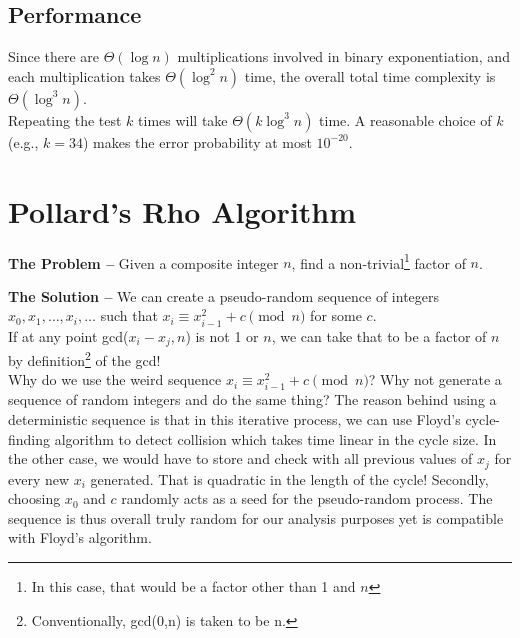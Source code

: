 \subsection{Performance}
Since there are \(\Theta(\log n)\) multiplications involved in binary exponentiation, 
and each multiplication takes \(\Theta(\log^2 n)\) time, the overall total time complexity 
is \(\Theta(\log^3 n)\).\\


\noindent Repeating the test $k$ times will take $\Theta(k\log^3 n)$ time. A reasonable 
choice of \(k\) (e.g., \(k=34\)) makes the error probability at most $10^{-20}$.

\section{Pollard's Rho Algorithm}

\textbf{The Problem --} Given a composite integer \(n\), find a non-trivial\footnote{In this case, 
that would be a factor other than 1 and \(n\)} factor of \(n\). 

\vspace{1em}
\noindent \textbf{The Solution --} We can create a pseudo-random
sequence of integers $x_0, x_1, \dots, x_i, \dots$ such that 
$x_i \equiv x_{i-1}^2 + c \pmod n$ for some $c$.\\


\noindent If at any point gcd(\(x_i-x_j,n\)) is not 1 or 
\(n\), we can take that to be a 
factor of \(n\) by definition\footnote{Conventionally, gcd(0,n) is taken to be n.} of the gcd! \\


Why do we use the weird sequence \(x_i \equiv x_{i-1}^2 + c \pmod n\)? 
Why not generate a sequence of random integers and do the same thing?
The reason behind using a deterministic sequence is that in this iterative process, we can use 
Floyd's cycle-finding algorithm to detect collision which takes time 
linear in the cycle size. In the other case, we would have to store and check with all previous 
values of $x_j$ for every new $x_i$ generated. That is quadratic in the length of the cycle!
Secondly, choosing $x_0$ and $c$ randomly acts as a seed for the pseudo-random process. The sequence is thus
overall truly random for our analysis purposes yet is compatible with Floyd's algorithm.

